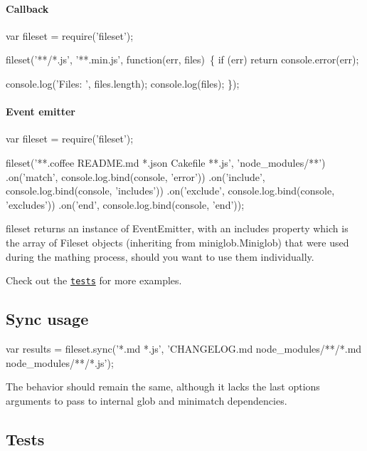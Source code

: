 \paragraph*{Callback}


\begin{DoxyCode}
var fileset = require('fileset');

fileset('**/*.js', '**.min.js', function(err, files) \{
  if (err) return console.error(err);

  console.log('Files: ', files.length);
  console.log(files);
\});
\end{DoxyCode}


\paragraph*{Event emitter}


\begin{DoxyCode}
var fileset = require('fileset');

fileset('**.coffee README.md *.json Cakefile **.js', 'node\_modules/**')
  .on('match', console.log.bind(console, 'error'))
  .on('include', console.log.bind(console, 'includes'))
  .on('exclude', console.log.bind(console, 'excludes'))
  .on('end', console.log.bind(console, 'end'));
\end{DoxyCode}


{\ttfamily fileset} returns an instance of Event\+Emitter, with an {\ttfamily includes} property which is the array of Fileset objects (inheriting from {\ttfamily miniglob.\+Miniglob}) that were used during the mathing process, should you want to use them individually.

Check out the \href{https://github.com/mklabs/node-fileset/tree/master/tests}{\tt tests} for more examples.

\subsection*{Sync usage}


\begin{DoxyCode}
var results = fileset.sync('*.md *.js', 'CHANGELOG.md node\_modules/**/*.md node\_modules/**/*.js');
\end{DoxyCode}


The behavior should remain the same, although it lacks the last {\ttfamily options} arguments to pass to internal {\ttfamily glob} and {\ttfamily minimatch} dependencies.

\subsection*{Tests}

